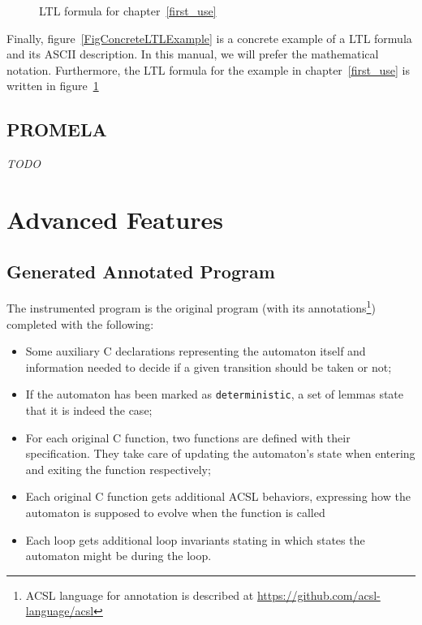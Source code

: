 \documentclass{report}
\begin{document}
  \begin{figure}
\medskip{}
  \caption{LTL formula for  chapter~\ref{first_use}}
  \label{LTL_first_use}
  \end{figure}

Finally, figure~\ref{FigConcreteLTLExample} is a concrete example of
a LTL formula and its ASCII description. In this manual, we will
prefer the mathematical notation. Furthermore, the LTL formula for
the example in chapter~\ref{first_use} is written in
figure~\ref{LTL_first_use}

\section{PROMELA}
  \emph{TODO}

\chapter{Advanced Features}
\section{Generated Annotated Program}
\label{generated_annotated_file}

The instrumented program is
the original program (with its annotations\footnote{ ACSL language for
  annotation is described at \url{https://github.com/acsl-language/acsl}})
completed with the following:
\begin{itemize}
\item Some auxiliary C declarations representing the automaton itself
and information needed to decide if a given transition should be taken or not;
\item If the automaton has been marked as \texttt{deterministic}, a set of
lemmas state that it is indeed the case;
\item For each original C function, two functions are defined with their
specification. They take care of updating the automaton's state when entering
and exiting the function respectively;
\item Each original C function gets additional ACSL behaviors, expressing how
the automaton is supposed to evolve when the function is called
\item Each loop gets additional loop invariants stating in which states the
automaton might be during the loop.
\end{itemize}
\end{document}
